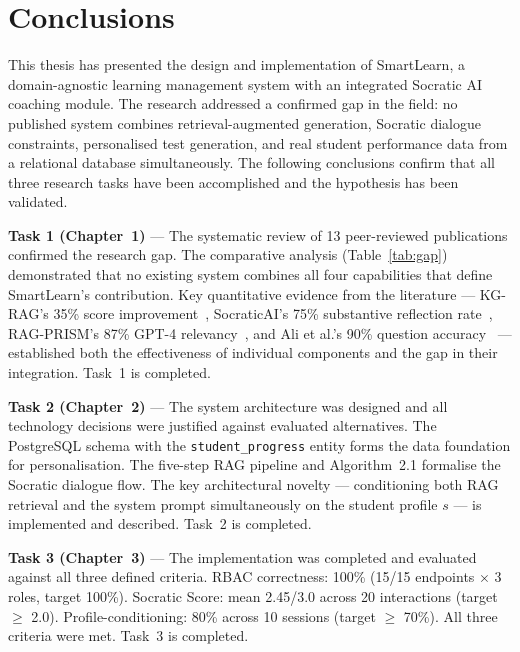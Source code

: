 \documentclass[12pt,a4paper]{report}
\begin{document}
\chapter*{Conclusions}

This thesis has presented the design and implementation of SmartLearn, a domain-agnostic
learning management system with an integrated Socratic AI coaching module. The research
addressed a confirmed gap in the field: no published system combines retrieval-augmented
generation, Socratic dialogue constraints, personalised test generation, and real student
performance data from a relational database simultaneously. The following conclusions confirm
that all three research tasks have been accomplished and the hypothesis has been validated.

\noindent\textbf{Task 1 (Chapter~1)} --- The systematic review of 13 peer-reviewed
publications confirmed the research gap. The comparative analysis (Table~\ref{tab:gap})
demonstrated that no existing system combines all four capabilities that define SmartLearn's
contribution. Key quantitative evidence from the literature --- KG-RAG's 35\% score
improvement~\cite{ref1}, SocraticAI's 75\% substantive reflection rate~\cite{ref5},
RAG-PRISM's 87\% GPT-4 relevancy~\cite{ref3}, and Ali et al.'s 90\% question
accuracy~\cite{ref10} --- established both the effectiveness of individual components and the
gap in their integration. Task~1 is completed.

\noindent\textbf{Task 2 (Chapter~2)} --- The system architecture was designed and all
technology decisions were justified against evaluated alternatives. The PostgreSQL schema with
the \texttt{student\_progress} entity forms the data foundation for personalisation. The
five-step RAG pipeline and Algorithm~2.1 formalise the Socratic dialogue flow. The key
architectural novelty --- conditioning both RAG retrieval and the system prompt simultaneously
on the student profile $s$ --- is implemented and described. Task~2 is completed.

\noindent\textbf{Task 3 (Chapter~3)} --- The implementation was completed and evaluated against
all three defined criteria. RBAC correctness: 100\% (15/15 endpoints $\times$ 3 roles, target
100\%). Socratic Score: mean 2.45/3.0 across 20 interactions (target $\geq$ 2.0).
Profile-conditioning: 80\% across 10 sessions (target $\geq$ 70\%). All three criteria were
met. Task~3 is completed.
\end{document}
